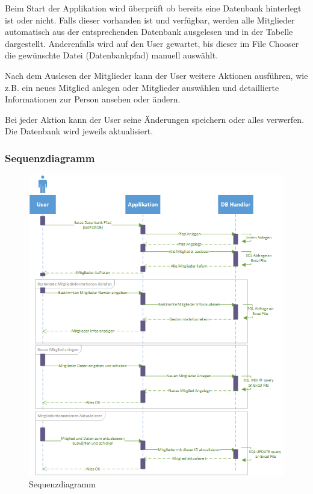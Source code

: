 \documentclass{article}
\begin{document}
Beim Start der Applikation wird überprüft ob bereits eine Datenbank hinterlegt ist oder nicht. Falls dieser vorhanden ist und verfügbar, werden alle Mitglieder automatisch aus der entsprechenden Datenbank ausgelesen und in der Tabelle dargestellt. Anderenfalls wird auf den User gewartet, bis dieser im File Chooser die gewünschte Datei (Datenbankpfad) manuell auswählt. 

Nach dem Auslesen der Mitglieder kann der User weitere Aktionen ausführen, wie z.B. ein neues Mitglied anlegen oder Mitglieder auswählen und detaillierte Informationen zur Person ansehen oder ändern.

Bei jeder Aktion kann der User seine Änderungen speichern oder alles verwerfen. Die Datenbank wird jeweils aktualisiert.

\newpage


\subsubsection{Sequenzdiagramm}
\begin{figure}[h]
	\centering
	\includegraphics[width=0.8 \textwidth]{Sequenz-Diagramm_v1}
	\caption{Sequenzdiagramm}
\end{figure}
\end{document}
